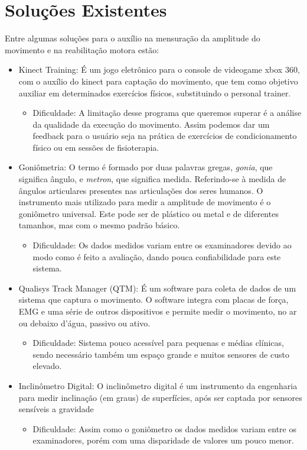 \section{Soluções Existentes}
\label{Sec:SolucoesExistentes}
Entre algumas soluções para o auxílio na mensuração da amplitude do movimento
e na reabilitação motora estão:
\begin{itemize}

\item Kinect Training: É um jogo eletrônico para o console de videogame xbox
360, com o auxílio do kinect para captação do movimento, que tem como objetivo
auxiliar em determinados exercícios físicos, substituindo o personal trainer.
  \begin{itemize}
  \item Dificuldade: A limitação desse programa que queremos superar é a
  análise da qualidade da execução do movimento. Assim podemos dar um feedback
  para o usuário seja na prática de exercícios de  condicionamento físico ou em
  sessões de fisioterapia.
  \end{itemize}

\item Goniômetria: O termo é formado por duas palavras gregas, \textit{gonia},
que significa ângulo, e \textit{metron}, que significa medida. Referindo-se à
medida de ângulos articulares presentes nas articulações dos seres humanos.
O instrumento mais utilizado para medir a amplitude de movimento é o goniômetro
universal. Este pode ser de plástico ou metal e de diferentes tamanhos, mas com
 o mesmo padrão básico\cite{manualGoniometria}.
  \begin{itemize}
  \item Dificuldade: Os dados medidos variam entre os examinadores devido ao modo como
  é feito a avaliação,  dando pouca confiabilidade para este sistema.
  \end{itemize}

\item Qualisys Track Manager (QTM): É um software para coleta de dados de um
sistema que captura o movimento. O software integra com placas de força, EMG
e uma série de outros dispositivos e permite medir o movimento, no ar
ou debaixo d'água, passivo ou ativo\cite{qtm}.
  \begin{itemize}
  \item Dificuldade: Sistema pouco acessível para pequenas e médias clínicas,
  sendo necessário também um espaço grande e muitos sensores de custo elevado.
  \end{itemize}

\item Inclinômetro Digital: O inclinômetro digital é um instrumento da
engenharia para medir inclinação (em graus) de superfícies, após ser captada
por sensores sensíveis a gravidade\cite{erroMedicao2012}
  \begin{itemize}
  \item Dificuldade: Assim como o goniômetro os dados medidos variam entre os
  examinadores, porém com uma disparidade de valores um pouco menor.
  \end{itemize}

\end{itemize}

